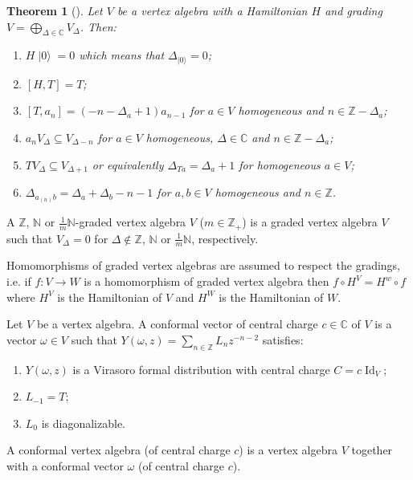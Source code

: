 \documentclass[a4paper, 12pt, reqno]{amsart}
\newtheorem{theorem}{Theorem}[section]
\theoremstyle{remark}
\numberwithin{equation}{subsection}
\DeclareMathOperator{\Id}{Id}
\DeclareMathOperator{\vac}{|0\rangle}
\begin{document}
\begin{theorem}[{\cite[\S4.9]{kac_vertex_1998}}]
  \label{thr:22}
  Let $V$ be a vertex algebra with a Hamiltonian $H$ and grading $V = \bigoplus_{\Delta \in \mathbb{C}}V_{\Delta}$.
  Then:
  \begin{enumerate}
  \item $H\vac = 0$ which means that $\Delta_{\vac} = 0$;
  \item $[H, T] = T$;
  \item $[T, a_n] = (-n - \Delta_a + 1)a_{n - 1}$ for $a \in V$ homogeneous and $n \in \mathbb{Z} - \Delta_a$;
  \item $a_nV_{\Delta} \subseteq V_{\Delta - n}$ for $a \in V$ homogeneous, $\Delta \in \mathbb{C}$ and $n \in \mathbb{Z} - \Delta_a$;
  \item $TV_\Delta \subseteq V_{\Delta + 1}$ or equivalently $\Delta_{Ta} = \Delta_a + 1$ for homogeneous $a \in V$;
  \item $\Delta_{a_{(n)}b} = \Delta_a + \Delta_b - n - 1$ for $a, b \in V$ homogeneous and $n \in \mathbb{Z}$.
  \end{enumerate}
\end{theorem}

A $\mathbb{Z}$, $\mathbb{N}$ or $\frac{1}{m}\mathbb{N}$-graded vertex algebra $V$ ($m \in \mathbb{Z}_+$) is a graded vertex algebra $V$ such that $V_{\Delta} = 0$ for $\Delta \notin \mathbb{Z}$, $\mathbb{N}$ or $\frac{1}{m}\mathbb{N}$, respectively.

Homomorphisms of graded vertex algebras are assumed to respect the gradings, i.e. if $f: V \to W$ is a homomorphism of graded vertex algebra then $f\circ H^V = H^w\circ f$ where $H^V$ is the Hamiltonian of $V$ and $H^W$ is the Hamiltonian of $W$.

Let $V$ be a vertex algebra.
A conformal vector of central charge $c \in \mathbb{C}$ of $V$ is a vector $\omega \in V$ such that $Y(\omega, z) = \sum_{n \in \mathbb{Z}}L_nz^{-n - 2}$ satisfies:
\begin{enumerate}
\item $Y(\omega, z)$ is a Virasoro formal distribution with central charge $C = c\Id_V$;
\item $L_{-1} = T$;
\item $L_0$ is diagonalizable. 
\end{enumerate}

A conformal vertex algebra (of central charge $c$) is a vertex algebra $V$ together with a conformal vector $\omega$ (of central charge $c$).
\end{document}
